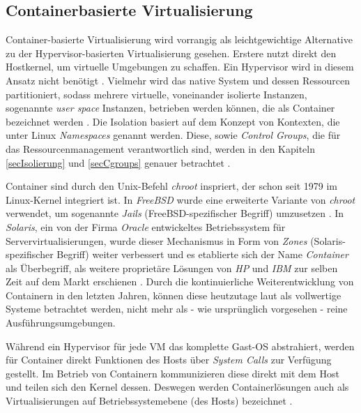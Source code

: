 \documentclass[../main.tex]{subfiles}
\begin{document}

    \subsection{Containerbasierte Virtualisierung}
    \label{introVirtContainer}
      Container-basierte Virtualisierung wird vorrangig als leichtgewichtige Alternative zu der Hypervisor-basierten Virtualisierung gesehen\cite[S.2]{containerVirtPerformance}. Erstere nutzt direkt den Hostkernel, um virtuelle Umgebungen zu schaffen. Ein Hypervisor wird in diesem Ansatz nicht benötigt \cite[S.6+7]{dockerBook}. Vielmehr wird das native System und dessen Ressourcen partitioniert, sodass mehrere virtuelle, voneinander isolierte Instanzen, sogenannte \emph{user space} Instanzen, betrieben werden können, die als Container bezeichnet werden \cite[S.2]{containerVirtPerformance}\cite[S.3]{dockerSecIntro}\cite[S.1]{dockerSec2}. Die Isolation basiert auf dem Konzept von Kontexten, die unter Linux \emph{Namespaces} genannt werden. Diese, sowie \emph{Control Groups}, die für das Ressourcenmanagement verantwortlich sind, werden in den Kapiteln \ref{secIsolierung} und \ref{secCgroups} genauer betrachtet \cite[S.4]{dockerSecIntro}.

      Container sind durch den Unix-Befehl \emph{chroot}\cite{chroot} inspriert, der schon seit 1979 im Linux-Kernel integriert ist. In \emph{FreeBSD} wurde eine erweiterte Variante von \emph{chroot} verwendet, um sogenannte \emph{Jails} (FreeBSD-spezifischer Begriff) umzusetzen \cite{jails}. In \emph{Solaris}, ein von der Firma \emph{Oracle} entwickeltes Betriebssystem für Servervirtualisierungen\cite{solaris}, wurde dieser Mechanismus in Form von \emph{Zones} (Solaris-spezifischer Begriff) \cite{zones} weiter verbessert und es etablierte sich der Name \emph{Container} als Überbegriff, als weitere proprietäre Lösungen von \emph{HP} und \emph{IBM} zur selben Zeit auf dem Markt erschienen \cite[S.2]{dockerLXCKub}. Durch die kontinuierliche Weiterentwicklung von Containern in den letzten Jahren, können diese heutzutage laut \cite[S.7]{dockerBook} als vollwertige Systeme betrachtet werden, nicht mehr als - wie ursprünglich vorgesehen - reine Ausführungsumgebungen.

      Während ein Hypervisor für jede \acrshort{VM} das komplette Gast-\acrshort{OS} abstrahiert, werden für Container direkt Funktionen des Hosts über \emph{System Calls} zur Verfügung gestellt. Im Betrieb von Containern kommunizieren diese direkt mit dem Host und teilen sich den Kernel dessen. Deswegen werden Containerlösungen auch als Virtualisierungen auf Betriebssystemebene (des Hosts) bezeichnet \cite[S.6+7]{dockerBook}\cite[S.2]{containerVirtPerformance}\cite[S.3]{dockerLXCKub}.
\end{document}
